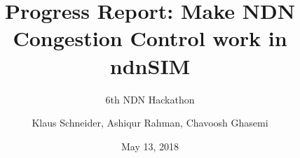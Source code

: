\documentclass[12pt,nonotes]{beamer}
\author{\footnotesize Klaus Schneider, Ashiqur Rahman, Chavoosh Ghasemi}
\title{Progress Report: Make NDN Congestion Control work in ndnSIM}
\subtitle{6th NDN Hackathon}
\date{May 13, 2018}
\institute{The University of Arizona}
\begin{document}
\frame{\titlepage}

%

%	
\end{document}
